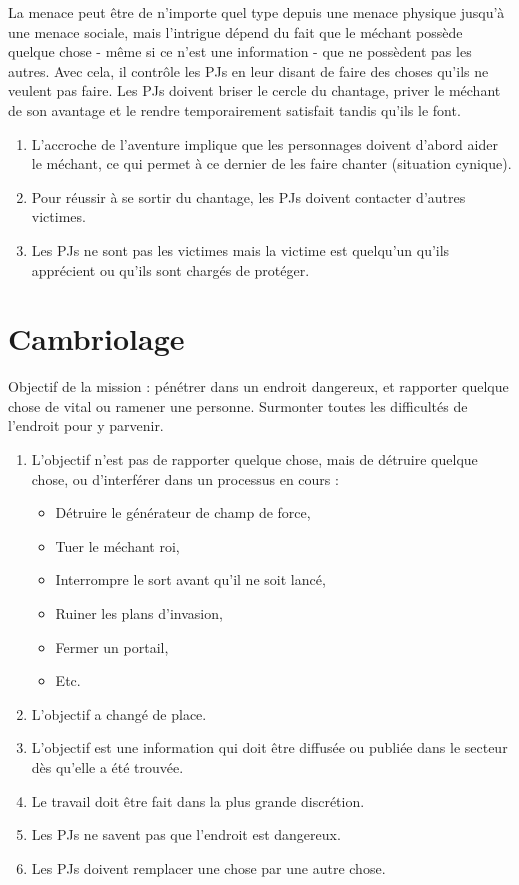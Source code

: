 \begin{multicols}{2}
La menace peut être de n'importe quel type depuis une menace physique jusqu'à une menace sociale, mais l'intrigue dépend du fait que le méchant possède quelque chose - même si ce n'est une information - que ne possèdent pas les autres. Avec cela, il contrôle les PJs en leur disant de faire des choses qu'ils ne veulent pas faire. Les PJs doivent briser le cercle du chantage, priver le méchant de son avantage et le rendre temporairement satisfait tandis qu'ils le font.

\themes
\begin{enumerate}
\item L'accroche de l'aventure implique que les personnages doivent d'abord aider le méchant, ce qui permet à ce dernier de les faire chanter (situation cynique).
\item Pour réussir à se sortir du chantage, les PJs doivent contacter d'autres victimes.
\item Les PJs ne sont pas les victimes mais la victime est quelqu'un qu'ils apprécient ou qu'ils sont chargés de protéger.
\end{enumerate}

\section{Cambriolage}
\hypertarget{cambriolage}{}


Objectif de la mission : pénétrer dans un endroit dangereux, et rapporter quelque chose de vital ou ramener une personne. Surmonter toutes les difficultés de l'endroit pour y parvenir.

\themes
\begin{enumerate}
\item L'objectif n'est pas de rapporter quelque chose, mais de détruire quelque chose, ou d'interférer dans un processus en cours :
\begin{itemize}
\item Détruire le générateur de champ de force,
\item Tuer le méchant roi,
\item Interrompre le sort avant qu'il ne soit lancé,
\item Ruiner les plans d'invasion,
\item Fermer un portail,
\item Etc.
\end{itemize}
\item L'objectif a changé de place.
\item L'objectif est une information qui doit être diffusée ou publiée dans le secteur dès qu'elle a été trouvée.
\item Le travail doit être fait dans la plus grande discrétion.
\item Les PJs ne savent pas que l'endroit est dangereux.
\item Les PJs doivent remplacer une chose par une autre chose.
\end{enumerate}


\end{multicols}
